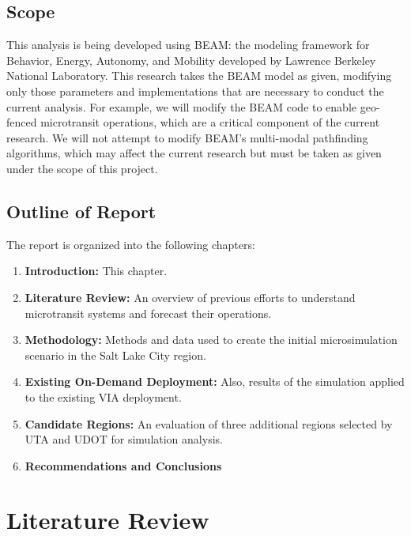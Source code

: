 \documentclass[
]{article}
\providecommand{\tightlist}{%
  \setlength{\itemsep}{0pt}\setlength{\parskip}{0pt}}
\begin{document}
\hypertarget{scope}{%
\subsection{Scope}\label{scope}}

This analysis is being developed using BEAM: the modeling framework for Behavior, Energy, Autonomy, and Mobility developed by Lawrence Berkeley National Laboratory. This research takes the BEAM model as given, modifying only those parameters and implementations that are necessary to conduct the current analysis. For example, we will modify the BEAM code to enable geo-fenced microtransit operations, which are a critical component of the current research. We will not attempt to modify BEAM's multi-modal pathfinding algorithms, which may affect the current research but must be taken as given under the scope of this project.

\hypertarget{outline-of-report}{%
\subsection{Outline of Report}\label{outline-of-report}}

The report is organized into the following chapters:

\begin{enumerate}
\def\labelenumi{\arabic{enumi}.}
\tightlist
\item
  \textbf{Introduction:} This chapter.
\item
  \textbf{Literature Review:} An overview of previous efforts to understand microtransit systems and forecast their operations.
\item
  \textbf{Methodology:} Methods and data used to create the initial microsimulation scenario in the Salt Lake City region.
\item
  \textbf{Existing On-Demand Deployment:} Also, results of the simulation applied to the existing VIA deployment.
\item
  \textbf{Candidate Regions:} An evaluation of three additional regions selected by UTA and UDOT for simulation analysis.
\item
  \textbf{Recommendations and Conclusions}
\end{enumerate}

\hypertarget{literature-review}{%
\section{Literature Review}\label{literature-review}}
\end{document}
